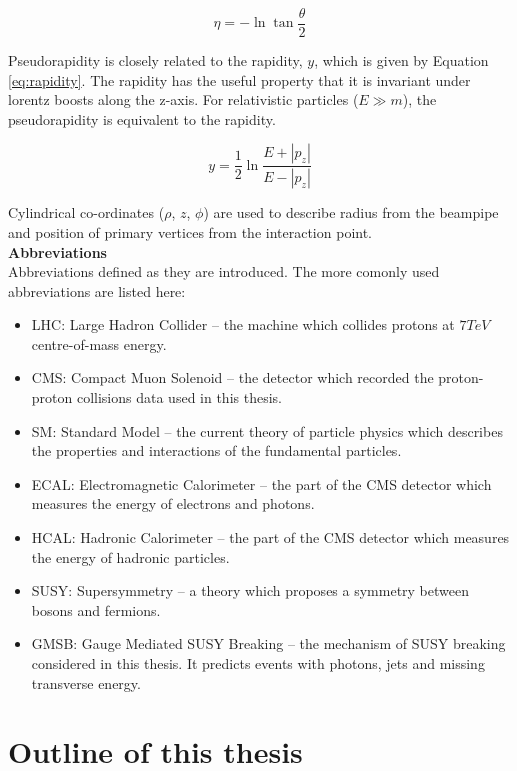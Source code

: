 \begin{equation}
\eta = -\ln\tan\frac{\theta}{2}
\label{eq:pseudorapidity}
\end{equation}

Pseudorapidity is closely related to the rapidity, $y$, which is given by
Equation \ref{eq:rapidity}. The rapidity has the useful property that it is
invariant under lorentz boosts along the z-axis. For relativistic particles ($E 
\gg m$), the pseudorapidity is equivalent to the rapidity.

\begin{equation}
y = \frac{1}{2}\ln\frac{E + |p_{z}|}{E - |p_{z}|}
\label{eq:rapidity}
\end{equation}

Cylindrical co-ordinates ($\rho$, $z$, $\phi$) are used to describe radius from 
the beampipe and position of primary vertices from the interaction point. \\

{\bf Abbreviations} \\

Abbreviations defined as they are introduced. The more comonly used
abbreviations are listed here:

\begin{itemize}
\item LHC: Large Hadron Collider -- the machine which collides protons at
$7\unit{TeV}$ centre-of-mass energy.
\item CMS: Compact Muon Solenoid -- the detector which recorded the 
proton-proton collisions data used in this thesis.
\item SM: Standard Model -- the current theory of particle physics which
describes the properties and interactions of the fundamental particles.
\item ECAL: Electromagnetic Calorimeter -- the part of the CMS detector which 
measures the energy of electrons and photons.
\item HCAL: Hadronic Calorimeter -- the part of the CMS detector which measures
the energy of hadronic particles.
\item SUSY: Supersymmetry -- a theory which proposes a symmetry between bosons
and fermions. 
\item GMSB: Gauge Mediated SUSY Breaking -- the mechanism of SUSY breaking
considered in this thesis. It predicts events with photons, jets and missing
transverse energy.
\end{itemize}

\section{Outline of this thesis}

